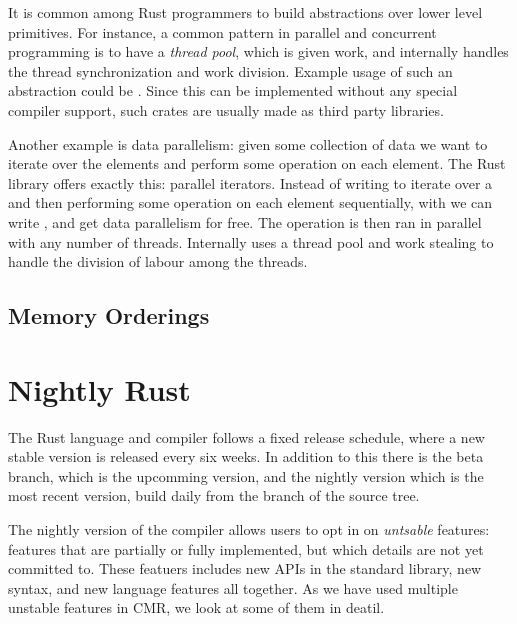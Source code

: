 It is common among Rust programmers to build abstractions over lower level primitives. For
instance, a common pattern in parallel and concurrent programming is to have a \emph{thread pool},
which is given work, and internally handles the thread synchronization and work division. Example
usage of such an abstraction could be .
Since this can be implemented without any special compiler support, such crates are usually made as
third party libraries.

Another example is data parallelism: given some collection of data we want to iterate over the
elements and perform some operation on each element. The Rust library  offers exactly
this: parallel iterators. Instead of writing  to iterate over a  and
then performing some operation on each element sequentially, with  we can write
, and get data parallelism for free. The operation is then ran in parallel
with any number of threads. Internally  uses a thread pool and work stealing to handle
the division of labour among the threads.


\subsection{Memory Orderings}

\section{Nightly Rust}

The Rust language and compiler follows a fixed release schedule, where a new stable version is
released every six weeks. In addition to this there is the beta branch, which is the upcomming
version, and the nightly version which is the most recent version, build daily from the
 branch of the source tree.

The nightly version of the compiler allows users to opt in on \emph{untsable} features: features
that are partially or fully implemented, but which details are not yet committed to. These featuers
includes new APIs in the standard library, new syntax, and new language features all together.
As we have used multiple unstable features in CMR, we look at some of them in deatil.


